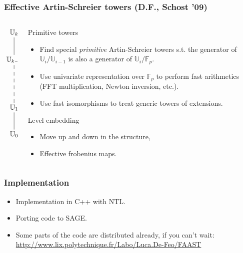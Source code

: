 \documentclass[10pt]{beamer}
\newcommand{\blue}[1]{\textcolor{blue}{#1}}  %
\newcommand{\U}{\mathbb{U}}  %
\newcommand{\F}{\mathbb{F}}  %
\newcommand{\0}{\mathcal{O}}  %
\begin{document}
\begin{frame}
  \frametitle{Effective Artin-Schreier towers (D.F., Schost '09)}

  \begin{columns}
    \begin{column}{0.1\textwidth}
      \Large\[\xymatrix{
        \U_k\ar@{-}[d]\\
        \U_{k-1} \ar@{--}[dd]\\
        \\
        \U_1 \ar@{-}[d]\\
        \U_0
      }\]
    \end{column}
    \begin{column}{0.85\textwidth}
      \vspace{-3mm}
      \begin{block}{Primitive towers}
        \begin{itemize}
        \item Find special \emph{primitive} Artin-Schreier towers
          s.t. the generator of $\U_i/\U_{i-1}$ is also a generator of
          $\U_i/\F_p$.
        \item Use univariate representation over $\F_p$ to perform
          fast arithmetics (FFT multiplication, Newton inversion,
          etc.).
        \item Use fast isomorphisms to treat generic towers of
          extensions.
        \end{itemize}
      \end{block}
      
      \begin{block}{Level embedding}
        \begin{itemize}
        \item Move up and down in the structure,
        \item Effective frobenius maps.
        \end{itemize}
      \end{block}
    \end{column}
  \end{columns}
\end{frame}


\begin{frame}
  \frametitle{Implementation}

  \begin{itemize}
  \item Implementation in C++ with NTL.
  \item Porting code to SAGE.
  \item Some parts of the code are distributed already, if you can't
    wait:
    \blue{\url{http://www.lix.polytechnique.fr/Labo/Luca.De-Feo/FAAST}}
  \end{itemize}
\end{frame}
\end{document}
